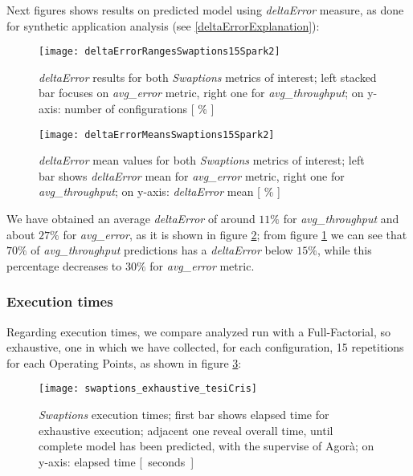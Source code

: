 Next figures shows results on predicted model using \textit{deltaError} measure, as done for synthetic application analysis (see \ref{deltaErrorExplanation}):





\begin{figure}[H]

    \centering
    \texttt{[image: deltaErrorRangesSwaptions15Spark2]}
    \caption{\textit{deltaError} results for both \textit{Swaptions} metrics of interest; left stacked bar focuses on \textit{avg\_error} metric, right one for \textit{avg\_throughput}; on y-axis: number of configurations [ \% ]}
    \label{fig::swaptions15spark2::intervals}
    
\end{figure}

\begin{figure}[H]

    \centering
    \texttt{[image: deltaErrorMeansSwaptions15Spark2]}
    \caption{\textit{deltaError} mean values for both \textit{Swaptions} metrics of interest; left bar shows \textit{deltaError} mean for \textit{avg\_error} metric, right one for \textit{avg\_throughput}; on y-axis: \textit{deltaError} mean [ \% ]}
    \label{fig::swaptions15spark2::means}
    
\end{figure}





We have obtained an average \textit{deltaError} of around $11\%$ for \textit{avg\_throughput} and about $27\%$ for \textit{avg\_error}, as it is shown in figure \ref{fig::swaptions15spark2::means}; from figure \ref{fig::swaptions15spark2::intervals} we can see that $70\%$ of \textit{avg\_throughput} predictions has a \textit{deltaError} below $15\%$, while this percentage decreases to $30\%$ for \textit{avg\_error} metric.


\subsubsection{Execution times}

Regarding execution times, we compare analyzed run with a Full-Factorial, so exhaustive, one in which we have collected, for each configuration, 15 repetitions for each Operating Points, as shown in figure \ref{fig::sw::execT}:

\begin{figure}[H]

    \centering
    
    \texttt{[image: swaptions\_exhaustive\_tesiCris]}
    
    \caption{\textit{Swaptions} execution times; first bar shows elapsed time for exhaustive execution; adjacent one reveal overall time, until complete model has been predicted, with the supervise of Agorà; on y-axis: elapsed time \hbox{[ seconds ]}}
    
    \label{fig::sw::execT}
    
\end{figure}

